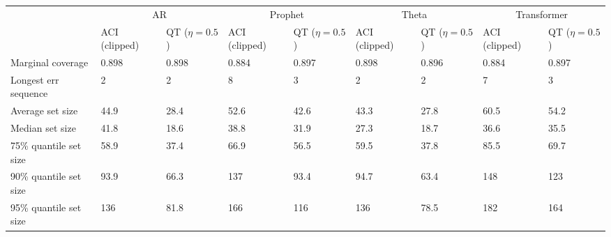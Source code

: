 \begin{tabular}{lllllllll}
\toprule
& \multicolumn{2}{c}{AR}& \multicolumn{2}{c}{Prophet}& \multicolumn{2}{c}{Theta}& \multicolumn{2}{c}{Transformer} \\
& ACI (clipped) & QT ($\eta=0.5$) & ACI (clipped) & QT ($\eta=0.5$) & ACI (clipped) & QT ($\eta=0.5$) & ACI (clipped) & QT ($\eta=0.5$) \\
\midrule
Marginal coverage & 0.898 & 0.898 & 0.884 & 0.897 & 0.898 & 0.896 & 0.884 & 0.897 \\
Longest err sequence & 2 & 2 & 8 & 3 & 2 & 2 & 7 & 3 \\
Average set size & 44.9 & 28.4 & 52.6 & 42.6 & 43.3 & 27.8 & 60.5 & 54.2 \\
Median set size & 41.8 & 18.6 & 38.8 & 31.9 & 27.3 & 18.7 & 36.6 & 35.5 \\
75\% quantile set size & 58.9 & 37.4 & 66.9 & 56.5 & 59.5 & 37.8 & 85.5 & 69.7 \\
90\% quantile set size & 93.9 & 66.3 & 137 & 93.4 & 94.7 & 63.4 & 148 & 123 \\
95\% quantile set size & 136 & 81.8 & 166 & 116 & 136 & 78.5 & 182 & 164 \\
\bottomrule
\end{tabular}
